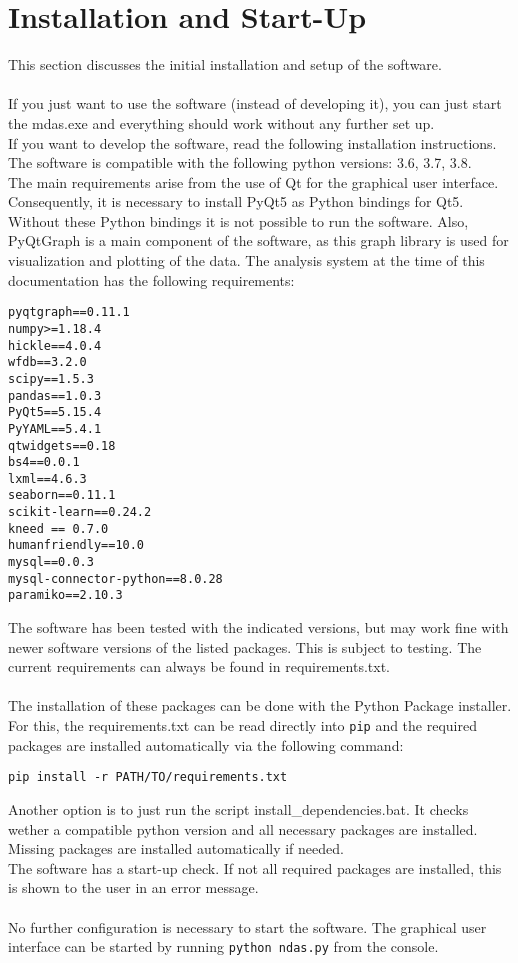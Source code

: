 
\chapter{Installation and Start-Up}
This section discusses the initial installation and setup of the software.\\
\\
If you just want to use the software (instead of developing it), you can just start the mdas.exe and everything should work without any further set up.
\\If you want to develop the software, read the following installation instructions.
\\The software is compatible with the following python versions: 3.6, 3.7, 3.8.
\\
The main requirements arise from the use of Qt for the graphical user interface. Consequently, it is necessary to install PyQt5 as Python bindings for Qt5. Without these Python bindings it is not possible to run the software. Also, PyQtGraph is a main component of the software, as this graph library is used for visualization and plotting of the data. The analysis system at the time of this documentation has the following requirements: 
\begin{lstlisting}[caption=requirements.txt: Current requirements for the analysis software.]
pyqtgraph==0.11.1
numpy>=1.18.4
hickle==4.0.4
wfdb==3.2.0
scipy==1.5.3
pandas==1.0.3
PyQt5==5.15.4
PyYAML==5.4.1
qtwidgets==0.18
bs4==0.0.1
lxml==4.6.3
seaborn==0.11.1
scikit-learn==0.24.2
kneed == 0.7.0
humanfriendly==10.0
mysql==0.0.3
mysql-connector-python==8.0.28
paramiko==2.10.3
\end{lstlisting}
The software has been tested with the indicated versions, but may work fine with newer software versions of the listed packages. This is subject to testing. The current requirements can always be found in requirements.txt.\\
\\
The installation of these packages can be done with the Python Package installer. For this, the requirements.txt can be read directly into \texttt{pip} and the required packages are installed automatically via the following command:
\begin{lstlisting}[caption=Installation of requirements from the requirements.txt.]
pip install -r PATH/TO/requirements.txt
\end{lstlisting}

Another option is to just run the script install\_dependencies.bat. It checks wether a compatible python version and all necessary packages are installed. Missing packages are installed automatically if needed.
\\
The software has a start-up check. If not all required packages are installed, this is shown to the user in an error message.\\
\\
No further configuration is necessary to start the software. The graphical user interface can be started by running \texttt{python ndas.py} from the console.
